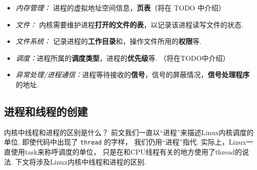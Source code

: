 \begin{itemize}
	\item\textit{内存管理：} 进程的虚拟地址空间信息，\textbf{页表}（将在 TODO 中介绍）
	\item \textit{文件：} 内核需要维护进程\textbf{打开的文件的表}，以记录该进程读写文件的状态.
	\item \textit{文件系统：} 记录进程的\textbf{工作目录}和，操作文件所用的\textbf{权限}等.
	\item \textit{调度：}进程所属的\textbf{调度类型}，进程的\textbf{优先级}等. （将在TODO中介绍）
	\item \textit{异常处理/进程通信：}进程等待接收的\textbf{信号}，信号的屏蔽情况，\textbf{信号处理程序}的地址.
\end{itemize}

\subsection{进程和线程的创建} \label{creating task}
\begin{qbox}{内核中线程和进程的区别是什么？}
	前文我们一直以“进程”来描述Linux内核调度的单位.
	即使代码中出现了 \lstinline{thread} 的字样，
	我们仍用“进程”指代.
	实际上，Linux一直使用task来称呼调度的单位，
	只是在和CPU线程有关的地方使用了thread的说法.
	下文将涉及Linux内核中线程和进程的区别.
\end{qbox}

